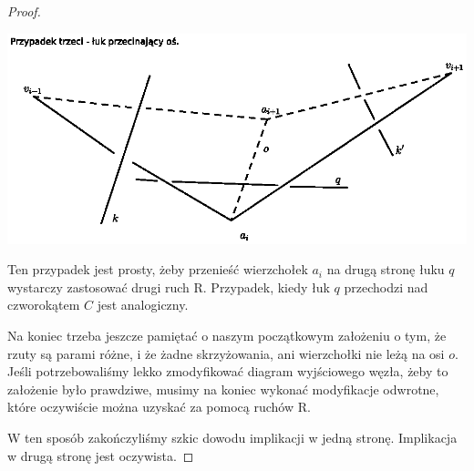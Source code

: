 \begin{proof}
\begin{minipage}{0.3\textwidth}
	\begin{center}

	\includegraphics[scale=0.8]{1/pictures/axis.eps}
	\end{center}
	\end{minipage}
	
Ten przypadek jest prosty, żeby przenieść wierzchołek $a_i$ na drugą stronę łuku $q$ wystarczy zastosować drugi ruch R. Przypadek, kiedy łuk $q$ przechodzi nad czworokątem $C$ jest analogiczny.

Na koniec trzeba jeszcze pamiętać o naszym początkowym założeniu o tym, że rzuty są parami różne, i że żadne skrzyżowania, ani wierzchołki nie leżą na osi $o$. Jeśli potrzebowaliśmy
lekko zmodyfikować diagram wyjściowego węzła, żeby to założenie było prawdziwe, musimy na koniec wykonać modyfikacje odwrotne, które oczywiście można uzyskać za pomocą ruchów R.

W ten sposób zakończyliśmy szkic dowodu implikacji w jedną stronę. Implikacja w drugą stronę jest oczywista. 
	
\end{proof}